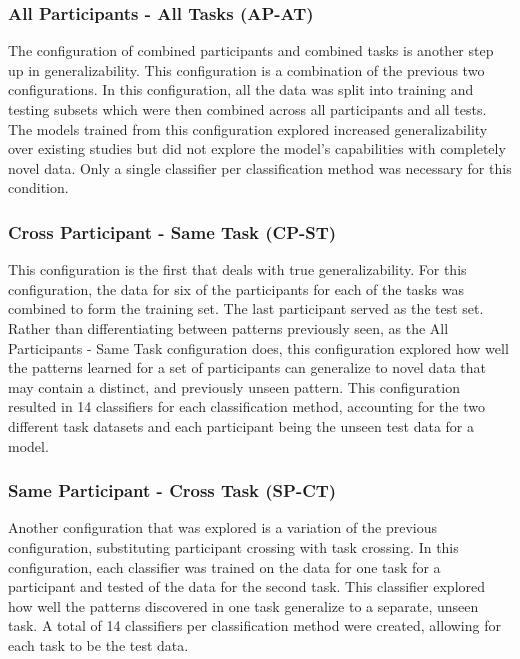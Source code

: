 \documentclass[11pt]{article}
\begin{document}
		\subsubsection{All Participants - All Tasks (AP-AT)}
		The configuration of combined participants and combined tasks is another step up in generalizability. This configuration is a combination of the previous two configurations. In this configuration, all the data was split into training and testing subsets which were then combined across all participants and all tests. The models trained from this configuration explored increased generalizability over existing studies but did not explore the model's capabilities with completely novel data. Only a single classifier per classification method was necessary for this condition.
		
		\subsubsection{Cross Participant - Same Task (CP-ST)}
		This configuration is the first that deals with true generalizability. For this configuration, the data for six of the participants for each of the tasks was combined to form the training set. The last participant served as the test set. Rather than differentiating between patterns previously seen, as the All Participants - Same Task configuration does, this configuration explored how well the patterns learned for a set of participants can generalize to novel data that may contain a distinct, and previously unseen pattern. This configuration resulted in 14 classifiers for each classification method, accounting for the two different task datasets and each participant being the unseen test data for a model.
		
		\subsubsection{Same Participant - Cross Task (SP-CT)}
		Another configuration that was explored is a variation of the previous configuration, substituting participant crossing with task crossing. In this configuration, each classifier was trained on the data for one task for a participant and tested of the data for the second task. This classifier explored how well the patterns discovered in one task generalize to a separate, unseen task. A total of 14 classifiers per classification method were created, allowing for each task to be the test data.
		
\end{document}
